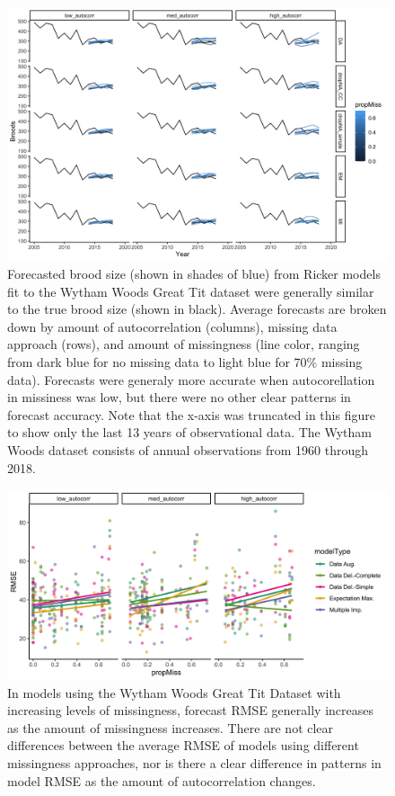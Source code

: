\documentclass{article}
\begin{document}
\begin{figure}
    \noindent\includegraphics[width = \textwidth]{Figures/forecastAccuracy_poisson.png}
    \caption{Forecasted brood size (shown in shades of blue) from Ricker models fit to the Wytham Woods Great Tit dataset were generally similar to the true brood size (shown in black). Average forecasts are broken down by amount of autocorrelation (columns), missing data approach (rows), and amount of missingness (line color, ranging from dark blue for no missing data to light blue for 70\% missing data). Forecasts were generaly more accurate when autocorellation in missiness was low, but there were no other clear patterns in forecast accuracy. Note that the x-axis was truncated in this figure to show only the last 13 years of observational data. The Wytham Woods dataset consists of annual observations from 1960 through 2018.  }
    \label{fig:forecastAccuracy_poisson}
\end{figure}

\begin{figure}
    \noindent\includegraphics[width = \textwidth]{Figures/RMSE_poisson.png}
    \caption{In models using the Wytham Woods Great Tit Dataset with increasing levels of missingness, forecast RMSE generally increases as the amount of missingness increases. There are not clear differences between the average RMSE of models using different missingness approaches, nor is there a clear difference in patterns in model RMSE as the amount of autocorrelation changes.}
    \label{fig:forecastRMSE_poisson}
\end{figure}
\clearpage
\end{document}
